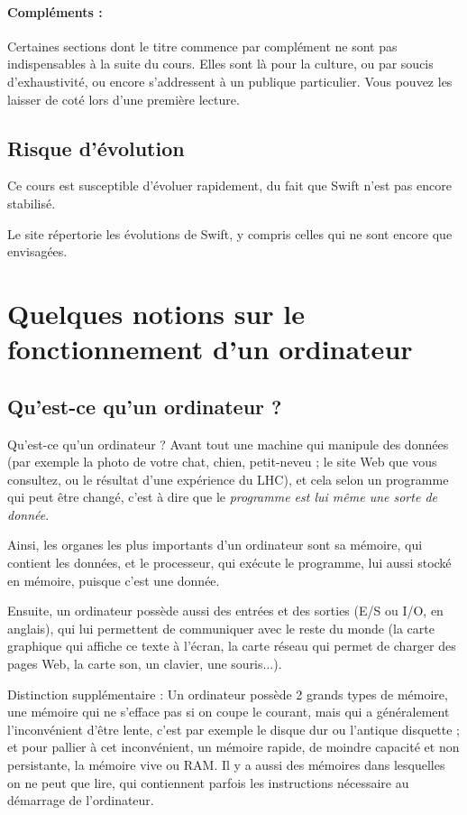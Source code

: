 \paragraph{Compléments :}
Certaines sections dont le titre commence par complément
ne sont pas indispensables à la suite du cours.
Elles sont là pour la culture, ou par soucis d'exhaustivité,
ou encore s'addressent à un publique particulier.
Vous pouvez les laisser de coté lors d'une première lecture.
\subsection{Risque d’évolution}
Ce cours est susceptible d'évoluer rapidement,
du fait que Swift n'est pas encore stabilisé.

Le site
répertorie les évolutions de Swift,
y compris celles qui ne sont encore que envisagées.
\section{Quelques notions sur le fonctionnement d'un ordinateur}
\subsection{Qu'est-ce qu'un ordinateur ?}
Qu'est-ce qu'un ordinateur ?
Avant tout une machine qui manipule des données
(par exemple la photo de votre chat, chien, petit-neveu ;
le site Web que vous consultez, ou le résultat d'une expérience du LHC),
et cela selon un programme qui peut être changé,
c'est à dire que le \emph{programme est lui même une sorte de donnée}.

Ainsi, les organes les plus importants d'un ordinateur sont
sa mémoire, qui contient les données, et le processeur,
qui exécute le programme, lui aussi stocké en mémoire, puisque c'est une donnée.

Ensuite, un ordinateur possède aussi des entrées et des sorties (E/S ou I/O, en anglais),
qui lui permettent de communiquer avec le reste du monde
(la carte graphique qui affiche ce texte à l'écran,
la carte réseau qui permet de charger des pages Web,
la carte son, un clavier, une souris...).

Distinction supplémentaire : Un ordinateur possède 2 grands types de mémoire,
une mémoire qui ne s'efface pas si on coupe le courant,
mais qui a généralement l'inconvénient d'être lente,
c'est par exemple le disque dur ou l'antique disquette ;
et pour pallier à cet inconvénient, un mémoire rapide,
de moindre capacité et non persistante, la mémoire vive ou RAM.
Il y a aussi des mémoires dans lesquelles on ne peut que lire, qui
contiennent parfois les instructions nécessaire au démarrage de l'ordinateur.
